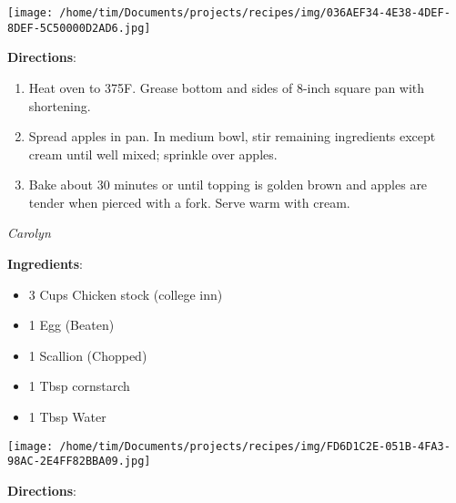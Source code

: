 \documentclass[11pt, twoside, openany]{book}
\begin{document}
\begin{minipage}[t]{0.2\linewidth}
\centering \strut\vspace*{-\baselineskip}\newline
\texttt{[image: /home/tim/Documents/projects/recipes/img/036AEF34-4E38-4DEF-8DEF-5C50000D2AD6.jpg]}\\
\end{minipage}\vspace{3mm}
\textbf{Directions}:
\vspace{-3mm}\begin{enumerate}\setlength\itemsep{-1mm}
\item Heat oven to 375F. Grease bottom and sides of 8-inch square pan with shortening.
\item Spread apples in pan. In medium bowl, stir remaining ingredients except cream until well mixed; sprinkle over apples.
\item Bake about 30 minutes or until topping is golden brown and apples are tender when pierced with a fork. Serve warm with cream.
\end{enumerate}
 \label{egg-drop-soup}\hfill\textit{Carolyn}\\
\begin{minipage}[t]{0.8\linewidth}
\textbf{Ingredients}:\vspace{-3mm}
\begin{multicols}{2}
\begin{itemize}\setlength\itemsep{-1mm}
\item 3 Cups Chicken stock (college inn)
\item 1 Egg (Beaten)
\item 1 Scallion (Chopped)
\item 1 Tbsp cornstarch
\item 1 Tbsp Water
\end{itemize}
\end{multicols}
\end{minipage}
\begin{minipage}[t]{0.2\linewidth}
\centering \strut\vspace*{-\baselineskip}\newline
\texttt{[image: /home/tim/Documents/projects/recipes/img/FD6D1C2E-051B-4FA3-98AC-2E4FF82BBA09.jpg]}\\
\end{minipage}\vspace{3mm}
\textbf{Directions}:
\end{document}
